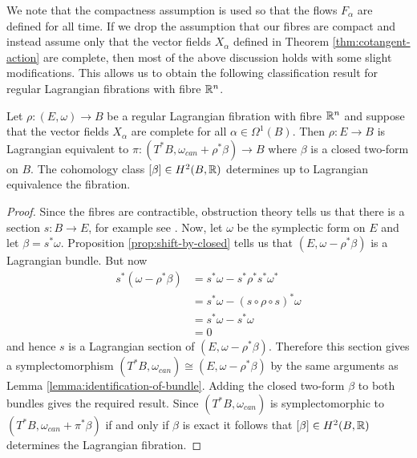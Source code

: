 \begin{remark}
    We note that the compactness assumption is used so that the flows $F_{\alpha}$ are defined for all time. If we drop the assumption that our fibres are compact and instead
    assume only that the vector fields $X_{\alpha}$ defined in Theorem \ref{thm:cotangent-action} are complete, then most of the above discussion holds with some slight modifications. This
    allows us to obtain the following classification result for regular Lagrangian fibrations with fibre $\mathbb{R}^n$.
\end{remark}
\begin{prop}
    Let $\rho: (E, \omega) \to B$ be a regular Lagrangian fibration with fibre $\mathbb{R}^n$ and suppose that the vector fields $X_{\alpha}$ are complete for all $\alpha \in \Omega^1(B)$. Then $\rho : E \to B$ is
    Lagrangian equivalent to $\pi: (T^*B , \omega_{can} + \rho^*\beta) \to B$ where $\beta$ is a closed two-form on $B$.
    The cohomology class $[\beta] \in H^2(B, \mathbb{R})$ determines up to Lagrangian equivalence the fibration.
\end{prop}
\begin{proof}
    Since the fibres are contractible, obstruction theory tells us that there is a section $s: B \to E$, for example see \cite{Davis2001LectureNI}. Now, let $\omega$ be the symplectic form
    on $E$ and let $\beta = s^* \omega$. Proposition \ref{prop:shift-by-closed} tells us that $(E, \omega - \rho^*\beta)$ is a Lagrangian bundle. But now
    \begin{align*}
        s^*(\omega - \rho^*\beta) & = s^*\omega - s^*\rho^*s^*\omega^*            \\
                                  & = s^*\omega - (s \circ \rho \circ s)^* \omega \\
                                  & = s^*\omega - s^*\omega                       \\
                                  & = 0
    \end{align*}
    and hence $s$ is a Lagrangian section of $(E, \omega - \rho^*\beta)$. Therefore this section gives a symplectomorphism
    $(T^*B, \omega_{can}) \cong (E, \omega - \rho^*\beta)$ by the same arguments as Lemma \ref{lemma:identification-of-bundle}. Adding the closed two-form $\beta$ to both bundles gives the required result.
    Since $(T^*B, \omega_{can})$ is symplectomorphic to $(T^*B, \omega_{can} + \pi^* \beta)$ if and only if $\beta$ is exact it follows that $[\beta] \in H^2(B, \mathbb{R})$ determines
    the Lagrangian fibration.
\end{proof}

